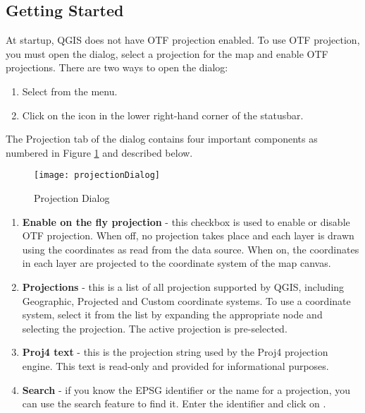 \subsection{Getting Started}\label{label_projstart}

At startup, QGIS does not have OTF projection enabled. To use OTF
projection, you must open the  dialog, select a
projection for the map and enable OTF projections. There are two ways to open
the  dialog:

\begin{enumerate}
\item Select  from the  menu.
\item Click on the  icon in the lower right-hand corner of the
statusbar.
\end{enumerate}

The Projection tab of the  dialog contains four important components as numbered in Figure
\ref{fig:projections} and described below.

\begin{figure}[ht]
   \begin{center}
   \caption{Projection Dialog \nixcaption}\label{fig:projections}\smallskip
   \texttt{[image: projectionDialog]}
\end{center}  
\end{figure}

\begin{enumerate}
\item \textbf{Enable on the fly projection} - this checkbox is used
to enable or disable OTF
projection. When off, no projection takes place and each layer
is drawn using the coordinates as read from the data source. When on, the
coordinates in each layer are projected to the coordinate system of the map
canvas.
\item \textbf{Projections} - this is a list of all projection supported by QGIS,
including Geographic, Projected and Custom coordinate systems. To use a
coordinate system, select it from the list by expanding the appropriate node
and selecting the projection. The active projection is pre-selected.
\item \textbf{Proj4 text} - this is the projection string used by the Proj4 projection
engine. This text is read-only and provided for informational purposes.
\item \textbf{Search} - if you know the EPSG identifier or the name 
for a projection, you can use the search feature to find it. Enter the 
identifier and click on .
\end{enumerate}


